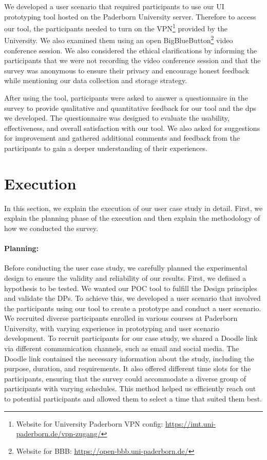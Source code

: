 We developed a user scenario that required participants to use our UI prototyping tool hosted on the Paderborn University server. 
Therefore to access our tool, the participants needed to turn on the VPN\footnote{Website for University Paderborn VPN config: \url{https://imt.uni-paderborn.de/vpn-zugang/}} provided by the University. 
We also examined them using an open BigBlueButton\footnote{Website for BBB: \url{https://open-bbb.uni-paderborn.de/}} video conference session. 
We also considered the ethical clarifications by informing the participants that we were not recording the video conference session and that the survey was anonymous to ensure their privacy and encourage honest feedback while mentioning our data collection and storage strategy.

After using the tool, participants were asked to answer a questionnaire in the survey to provide qualitative and quantitative feedback for our tool and the \ac{dp}s we developed. 
The questionnaire was designed to evaluate the usability, effectiveness, and overall satisfaction with our tool. 
We also asked for suggestions for improvement and gathered additional comments and feedback from the participants to gain a deeper understanding of their experiences.

\clearpage
\section{Execution}
\label{evaluation:section:execution}
In this section, we explain the execution of our user case study in detail. 
First, we explain the planning phase of the execution and then explain the methodology of how we conducted the survey.

\paragraph{Planning:}
Before conducting the user case study, we carefully planned the experimental design to ensure the validity and reliability of our results.
First, we defined a hypothesis to be tested. We wanted our POC tool to fulfill the Design principles and validate the DPs. 
To achieve this, we developed a user scenario that involved the participants using our tool to create a prototype and conduct a user scenario. 
We recruited diverse participants enrolled in various courses at Paderborn University, with varying experience in prototyping and user scenario development.
To recruit participants for our case study, we shared a Doodle link via different communication channels, such as email and social media. 
The Doodle link contained the necessary information about the study, including the purpose, duration, and requirements. 
It also offered different time slots for the participants, ensuring that the survey could accommodate a diverse group of participants with varying schedules. 
This method helped us efficiently reach out to potential participants and allowed them to select a time that suited them best.

